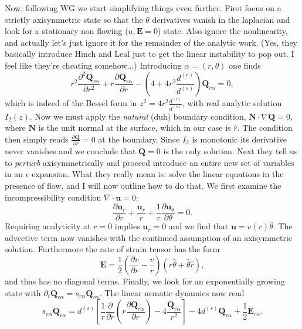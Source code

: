 \documentclass[onecolumn,showpacs,preprintnumbers,prl,amsmath,amssymb]{revtex4-1}
\def\b{\mathbf}
\begin{document}
Now, following WG we start simplifying things even further.  First focus on a strictly axisymmetric state so that the $\theta$ derivatives vanish in the laplacian and look for a stationary non flowing ($u,\b{E}=0$) state.  Also ignore the nonlinearity, and actually let's just ignore it for the remainder of the analytic work.  (Yes, they basically introduce Hinch and Leal just to get the linear instability to pop out.  I feel like they're cheating somehow...)  Introducing $\alpha=(r,\theta)$ one finds
\begin{equation}
r^2\frac{\partial^2\b{Q}_{r\alpha}}{\partial r^2}+r \frac{\partial\b{Q}_{r\alpha}}{\partial r}-(4+4r^2\frac{d^{(r)}}{d^{(s)}})\b{Q}_{r\alpha}=0,
\end{equation}
which is indeed of the Bessel form in $z^2=4r^2\frac{d^{(r)}}{d^{(s)}}$, with real analytic solution ~$I_2(z)$.  Now we must apply the \emph{natural} (duh) boundary condition, $\b{N}\cdot\nabla\b{Q}=0$, where $\b{N}$ is the unit normal at the surface, which in our case is $\hat{r}$.  The condition then simply reads $\frac{\partial \b{Q}}{\partial r}=0$ at the boundary.  Since $I_2$ is monotonic its derivative never vanishes and we conclude that $\b{Q}=0$ is the only solution.  Next they tell us to \emph{perturb} axisymmetrically and proceed introduce an entire new set of variables in an $\epsilon$ expansion.  What they really mean is: solve the linear equations in the presence of flow, and I will now outline how to do that.  We first examine the incompressibility condition $\nabla\cdot\b{u}=0$:
\begin{equation}
\frac{\partial\b{u}_r}{\partial r}+\frac{\b{u}_r}{r}+\frac{1}{r}\frac{\partial\b{u}_{\theta}}{\partial \theta}=0.
\end{equation}
Requiring analyticity at $r=0$ implies $\b{u}_r=0$ and we find that $\b{u}=v(r)\hat{\theta}$.  The advective term now vanishes with the continued assumption of an axisymmetric solution.  Furthermore the rate of strain tensor has the form
\begin{equation}
\b{E}=\frac{1}{2}\left(\frac{\partial v}{\partial r}-\frac{v}{r}\right)(\hat{r}\hat{\theta}+\hat{\theta}\hat{r}),
\end{equation}
and thus has no diagonal terms. Finally, we look for an exponentially growing state with $\partial_t\b{Q}_{r\alpha}=s_{r\alpha}\b{Q}_{r\alpha}$.  The linear nematic dynamics now read
\begin{equation}\label{eq:linear_nematic_flow}
s_{r\alpha}\b{Q}_{r\alpha}=d^{(s)}\left[\frac{1}{r}\frac{\partial}{\partial r}\left(r\frac{\partial\b{Q}_{r\alpha}}{\partial r}\right)-4\frac{\b{Q}_{r\alpha}}{r^2}\right]-4d^{(r)}\b{Q}_{r\alpha}+\frac{1}{2}\b{E}_{r\alpha}.
\end{equation}
\end{document}
